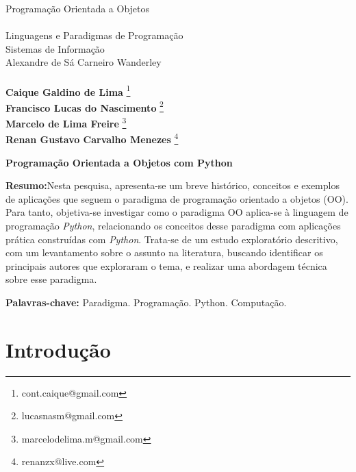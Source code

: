 \documentclass[11pt,a4paper]{article}
\makeatletter
\newcommand{\aluno}{{\bf Caique Galdino de Lima}
	\footnote{cont.caique@gmail.com}}
\newcommand{\alunodois}{{\bf Francisco Lucas do Nascimento}
	\footnote{lucasnasm@gmail.com}}
\newcommand{\alunotres}{{\bf  Marcelo de Lima Freire}
	\footnote{marcelodelima.m@gmail.com}}
\newcommand{\alunoquatro}{{\bf Renan Gustavo Carvalho Menezes}
	\footnote{renanzx@live.com}}
\newcommand{\prof}{{ Alexandre de  S\'a Carneiro Wanderley}}
\newcommand{\titu}{Programação Orientada a Objetos}
\newcommand{\disc}{Linguagens e Paradigmas de Programação}
\newcommand{\curso}{Sistemas de Informação}
\makeatother
\begin{document}
\Large
\begin{center} \titu \\ \ \\ \disc\\ \curso \\ \prof \\ \ \\ \aluno \\ \alunodois \\ \alunotres \\ \alunoquatro
\end{center}

\vspace{0.9in}
\vspace{0.9in}
\begin{center}\textbf{Programação Orientada a Objetos com Python }\end{center}

\newpage 
\tableofcontents
\vspace{0.9in}
\vspace{0.9in}


\segundapagina
% 
\begin{footnotesize}{\normalsize \noindent \textbf{Resumo:}Nesta pesquisa, apresenta-se um breve histórico, conceitos e exemplos de aplicações que seguem o paradigma de programação orientado a objetos (OO). 
Para tanto, objetiva-se investigar como o paradigma OO aplica-se à linguagem de 
programação \textit{Python}, relacionando os conceitos desse paradigma com aplicações prática construídas com \textit{Python}. 
Trata-se de um estudo exploratório descritivo, com um levantamento sobre o assunto na literatura, buscando identificar os principais autores que exploraram o tema, e realizar uma abordagem técnica sobre esse paradigma. 

\noindent\textbf{Palavras-chave:} Paradigma. Programação. Python. Computação.}
\end{footnotesize}
% 
% 
\segundapagina

\section{Introdução}
\end{document}
